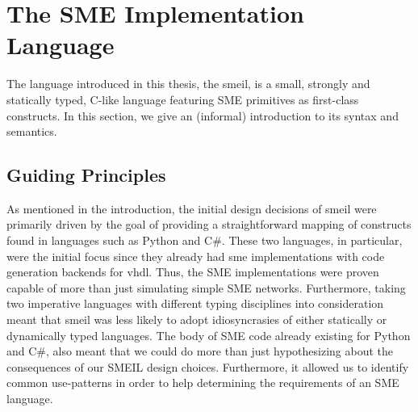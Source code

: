 \chapter{The SME Implementation Language}

The language introduced in this thesis, the \gls{smeil}, is a small, strongly and
statically typed, C-like language featuring SME primitives as first-class
constructs.
In this section, we give an (informal) introduction to its syntax and semantics.


\section{Guiding Principles}
As mentioned in the introduction, the initial design decisions of \gls{smeil}
were primarily driven by the goal of providing a straightforward mapping of
constructs found in languages such as Python and C\#. These two languages, in
particular, were the initial focus since they already had \gls{sme}
implementations with code generation backends for \gls{vhdl}. Thus, the SME
implementations were proven capable of more than just simulating simple SME
networks. Furthermore, taking two imperative languages with different typing
disciplines into consideration meant that \gls{smeil} was less likely to adopt
idiosyncrasies of either statically or dynamically typed languages. The body of
SME code already existing for Python and C\#, also meant that we could do more
than just hypothesizing about the consequences of our SMEIL design
choices. Furthermore, it allowed us to identify common use-patterns in order to
help determining the requirements of an SME language.




